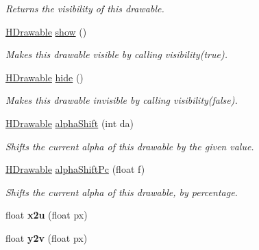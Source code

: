 \begin{DoxyCompactItemize}
\begin{DoxyCompactList}\small\item\em Returns the visibility of this drawable. \end{DoxyCompactList}\item 
\hyperlink{classhype_1_1core_1_1drawable_1_1_h_drawable}{H\-Drawable} \hyperlink{classhype_1_1core_1_1drawable_1_1_h_drawable_acab0f90892d84b754e9cc769ba9dc177}{show} ()
\begin{DoxyCompactList}\small\item\em Makes this drawable visible by calling {\ttfamily visibility(true)}. \end{DoxyCompactList}\item 
\hyperlink{classhype_1_1core_1_1drawable_1_1_h_drawable}{H\-Drawable} \hyperlink{classhype_1_1core_1_1drawable_1_1_h_drawable_a39dff6aef37343a177538d61ae751fb3}{hide} ()
\begin{DoxyCompactList}\small\item\em Makes this drawable invisible by calling {\ttfamily visibility(false)}. \end{DoxyCompactList}\item 
\hyperlink{classhype_1_1core_1_1drawable_1_1_h_drawable}{H\-Drawable} \hyperlink{classhype_1_1core_1_1drawable_1_1_h_drawable_a79d1c2ca4a8f1744b1625907213db1c6}{alpha\-Shift} (int da)
\begin{DoxyCompactList}\small\item\em Shifts the current alpha of this drawable by the given value. \end{DoxyCompactList}\item 
\hyperlink{classhype_1_1core_1_1drawable_1_1_h_drawable}{H\-Drawable} \hyperlink{classhype_1_1core_1_1drawable_1_1_h_drawable_aa8bb9a2d75f6997249d9022e17d0b812}{alpha\-Shift\-Pc} (float f)
\begin{DoxyCompactList}\small\item\em Shifts the current alpha of this drawable, by percentage. \end{DoxyCompactList}\item 
\hypertarget{classhype_1_1core_1_1drawable_1_1_h_drawable_aefc0cf9066fe2bf147a4178b7c6bf192}{float {\bfseries x2u} (float px)}\label{classhype_1_1core_1_1drawable_1_1_h_drawable_aefc0cf9066fe2bf147a4178b7c6bf192}

\item 
\hypertarget{classhype_1_1core_1_1drawable_1_1_h_drawable_a55e521bfb4597201ad1bf2ab4857e613}{float {\bfseries y2v} (float px)}\label{classhype_1_1core_1_1drawable_1_1_h_drawable_a55e521bfb4597201ad1bf2ab4857e613}


\end{DoxyCompactItemize}
